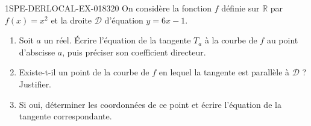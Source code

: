 \begin{exercice}{1SPE-DERLOCAL-EX-018}{3}{20}
On considère la fonction $f$ définie sur $\mathbb{R}$ par $f(x) = x^2$ et la droite $\mathcal{D}$ d'équation $y = 6x - 1$.

\begin{enumerate}
  \item Soit $a$ un réel. Écrire l'équation de la tangente $T_a$ à la courbe de $f$ au point d'abscisse $a$, puis préciser son coefficient directeur.
  \item Existe-t-il un point de la courbe de $f$ en lequel la tangente est parallèle à $\mathcal{D}$ ? Justifier.
  \item Si oui, déterminer les coordonnées de ce point et écrire l'équation de la tangente correspondante.
\end{enumerate}
\end{exercice}
